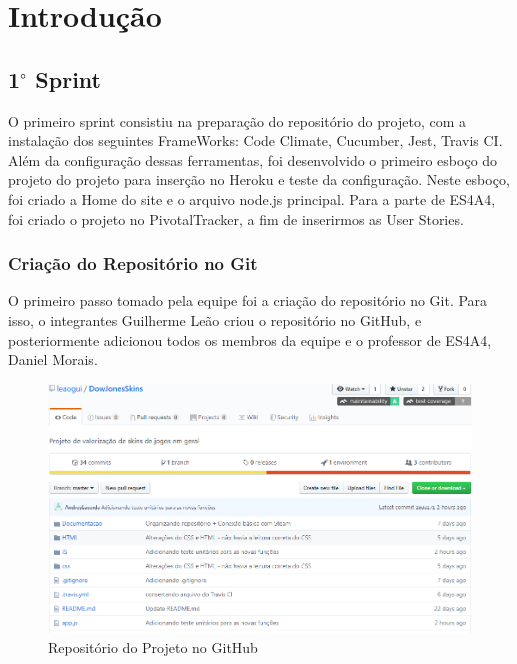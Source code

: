 
\chapter[Introdução]{Introdução}

  \section{1$^{\circ}$ Sprint}
O primeiro sprint consistiu na preparação do repositório do projeto, com a instalação dos seguintes
    FrameWorks: Code Climate, Cucumber, Jest, Travis CI. Além da configuração dessas ferramentas,
    foi desenvolvido o primeiro esboço do projeto do projeto para inserção no Heroku e teste da configuração.
    Neste esboço, foi criado a Home do site e o arquivo node.js principal. Para a parte de ES4A4,
    foi criado o projeto no PivotalTracker, a fim de inserirmos as User Stories.

    \subsection{Criação do Repositório no Git}
    O primeiro passo tomado pela equipe foi a criação do repositório no Git. Para isso, o integrantes
    Guilherme Leão criou o repositório no GitHub, e posteriormente adicionou todos os membros
    da equipe e o professor de ES4A4, Daniel Morais.\\
    \begin{figure}[!htb]
        \centering
        \includegraphics[scale=0.6]{Imagens/Repositorio.png}
        \caption{Repositório do Projeto no GitHub}
    \end{figure}

